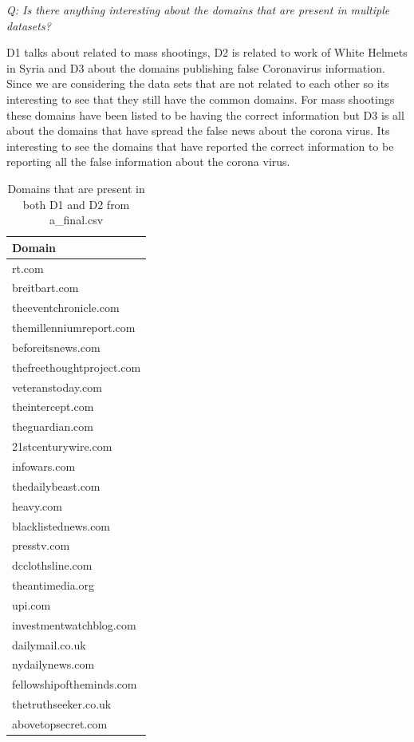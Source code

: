 \documentclass[12pt]{article}
\begin{document}
\emph{Q: Is there anything interesting about the domains that are present in multiple datasets?}

D1 talks about related to mass shootings, D2 is related to work of White Helmets in Syria and D3 about the domains publishing false Coronavirus information. Since we are considering the data sets that are not related to each other so its interesting to see that they still have the common domains. For mass shootings these domains have been listed to be having the correct information but D3 is all about the domains that have spread the false news about the corona virus. Its interesting to see the domains that have reported the correct information to be reporting all
the false information about the corona virus.
\begin{table}[ht]
\centering
\caption{Domains that are present in both D1 and D2 from a\_final.csv}
\label{tb3}
\begin{tabular}{|l|}
\hline
\textbf{Domain} \\ \hline \hline
rt.com \\ \hline
breitbart.com \\ \hline
theeventchronicle.com \\ \hline
themillenniumreport.com \\ \hline
beforeitsnews.com \\ \hline
thefreethoughtproject.com \\ \hline
veteranstoday.com \\ \hline
theintercept.com \\ \hline
theguardian.com \\ \hline
21stcenturywire.com\\ \hline
infowars.com\\ \hline
thedailybeast.com \\ \hline
heavy.com \\ \hline
blacklistednews.com \\ \hline
presstv.com \\ \hline
dcclothsline.com \\ \hline
theantimedia.org \\ \hline
upi.com \\ \hline
investmentwatchblog.com \\ \hline
dailymail.co.uk \\ \hline
nydailynews.com \\ \hline
fellowshipoftheminds.com \\ \hline
thetruthseeker.co.uk \\ \hline
abovetopsecret.com \\ \hline

\end{tabular}
\end{table}
\end{document}
